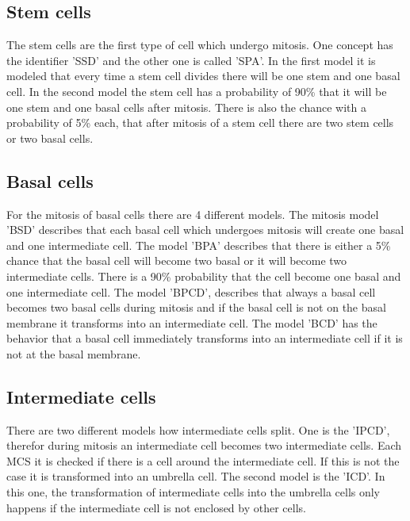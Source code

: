 \subsection{Stem cells}
The stem cells are the first type of cell which undergo mitosis. One concept has the identifier 'SSD' and the other one is called 'SPA'. In the first model it is modeled that every time a stem cell divides there will be one stem and one basal cell. In the second model the stem cell has a probability of 90\% that it will be one stem and one basal cells after mitosis. There is also the chance with a probability of 5\% each, that after mitosis of a stem cell there are two stem cells or two basal cells.
\subsection{Basal cells}
For the mitosis of basal cells there are 4 different models. The mitosis model 'BSD' describes that each basal cell which undergoes mitosis will create one basal and one intermediate cell. The model 'BPA' describes that there is either a 5\% chance that the basal cell will become two basal or it will become two intermediate cells. There is a 90\% probability that the cell become one basal and one intermediate cell. The model 'BPCD', describes that always a basal cell becomes two basal cells during mitosis and if the basal cell is not on the basal membrane it transforms into an intermediate cell. The model 'BCD' has the behavior that a basal cell immediately transforms into an intermediate cell if it is not at the basal membrane.\newline
\subsection{Intermediate cells}
There are two different models how intermediate cells split. One is the 'IPCD', therefor during mitosis an intermediate cell becomes two intermediate cells. Each \ac{MCS} it is checked if there is a cell around the intermediate cell. If this is not the case it is transformed into an umbrella cell. The second model is the 'ICD'. In this one, the transformation of intermediate cells into the umbrella cells only happens if the intermediate cell is not enclosed by other cells. \newline


